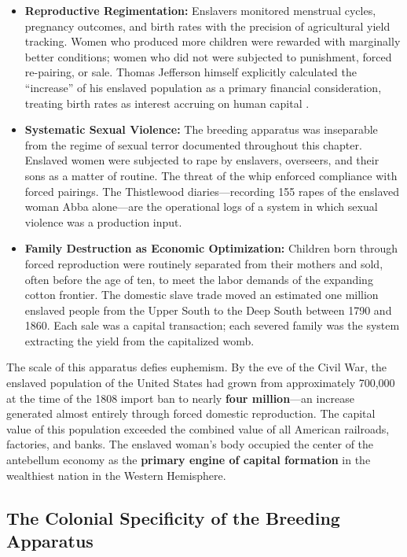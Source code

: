 \begin{itemize}
    \item \textbf{Reproductive Regimentation:} Enslavers monitored menstrual cycles, pregnancy outcomes, and birth rates with the precision of agricultural yield tracking. Women who produced more children were rewarded with marginally better conditions; women who did not were subjected to punishment, forced re-pairing, or sale. Thomas Jefferson himself explicitly calculated the ``increase'' of his enslaved population as a primary financial consideration, treating birth rates as interest accruing on human capital \cite{baptist}.

    \item \textbf{Systematic Sexual Violence:} The breeding apparatus was inseparable from the regime of sexual terror documented throughout this chapter. Enslaved women were subjected to rape by enslavers, overseers, and their sons as a matter of routine. The threat of the whip enforced compliance with forced pairings. The Thistlewood diaries---recording 155 rapes of the enslaved woman Abba alone---are the operational logs of a system in which sexual violence was a production input.

    \item \textbf{Family Destruction as Economic Optimization:} Children born through forced reproduction were routinely separated from their mothers and sold, often before the age of ten, to meet the labor demands of the expanding cotton frontier. The domestic slave trade moved an estimated one million enslaved people from the Upper South to the Deep South between 1790 and 1860. Each sale was a capital transaction; each severed family was the system extracting the yield from the capitalized womb.
\end{itemize}

The scale of this apparatus defies euphemism. By the eve of the Civil War, the enslaved population of the United States had grown from approximately 700,000 at the time of the 1808 import ban to nearly \textbf{four million}---an increase generated almost entirely through forced domestic reproduction. The capital value of this population exceeded the combined value of all American railroads, factories, and banks. The enslaved woman's body occupied the center of the antebellum economy as the \textbf{primary engine of capital formation} in the wealthiest nation in the Western Hemisphere.

\subsection{The Colonial Specificity of the Breeding Apparatus}

